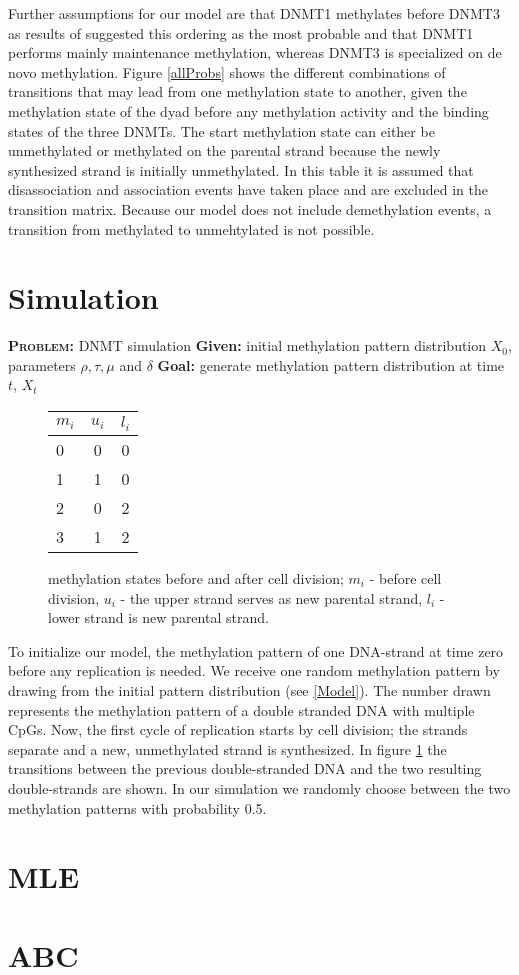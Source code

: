 Further assumptions for our model are that DNMT1 methylates before DNMT3 as results of \cite{Lueck} suggested this ordering as the most probable and that DNMT1 performs mainly maintenance methylation, whereas DNMT3 is specialized on de novo methylation. Figure \ref{allProbs} shows the different combinations of transitions that may lead from one methylation state to another, given the methylation state of the dyad before any methylation activity and the binding states of the three \acp{DNMT}. The start methylation state can either be unmethylated or methylated on the parental strand because the newly synthesized strand is initially unmethylated. In this table it is assumed that disassociation and association events have taken place and are excluded in the transition matrix. Because our model does not include demethylation events, a transition from methylated to unmehtylated is not possible.\\

\section{Simulation}
\label{sim}
\textbf{\textsc{Problem:}} \ac{DNMT} simulation\newline
\textbf{Given:} initial methylation pattern distribution $X_0$, parameters $\rho, \tau, \mu$ and $\delta$\newline
\textbf{Goal:} generate methylation pattern distribution at time $t$, $X_t$\\

\begin{figure}[h]
\begin{tabularx}{\textwidth}{l|c|c}
$m_i$&	$u_i$&	$l_i$\\
\hline
0&	0&	0\\
1&	1&	0\\
2&	0&	2\\
3&	1&	2\\
\end{tabularx}
\label{celldiv}
\caption{methylation states before and after cell division; $m_i$ - before cell division, $u_i$ - the upper strand serves as new parental strand, $l_i$ - lower strand is new parental strand.}
\end{figure}
To initialize our model, the methylation pattern of one DNA-strand at time zero before any replication is needed. We receive one random methylation pattern by drawing from the initial pattern distribution (see \ref{Model}). The number drawn represents the methylation pattern of a double stranded DNA with multiple \acp{CpG}. Now, the first cycle of replication starts by cell division; the strands separate and a new, unmethylated strand is synthesized. In figure \ref{celldiv} the transitions between the previous double-stranded DNA and the two resulting double-strands are shown. In our simulation we randomly choose between the two methylation patterns with probability 0.5.

\section{MLE}
\label{MLE}

\section{ABC}
\label{ABC}